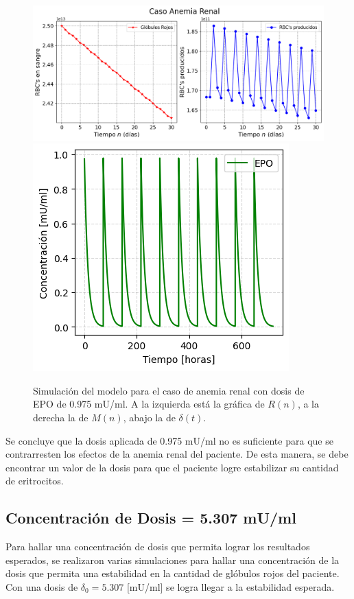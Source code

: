 \begin{figure}[H]
    \centering
    \captionsetup{justification=centering}
    \includegraphics[scale=0.534]{figures/AR11.png}
    \includegraphics[scale=0.8]{figures/AR12.png}
    \caption{Simulación del modelo para el caso de anemia renal con dosis de EPO de 0.975 mU/ml. A la izquierda está la gráfica de $R(n)$, a la derecha la de $M(n)$, abajo la de $\delta(t)$.}
    \label{sec:variaciones:fig:Anemia1}
\end{figure}

Se concluye que la dosis aplicada de 0.975 mU/ml no es suficiente para que se contrarresten los efectos de la anemia renal del paciente. De esta manera, se debe encontrar un valor de la dosis para que el paciente logre estabilizar su cantidad de eritrocitos.

\subsection{Concentración de Dosis = 5.307 mU/ml}

Para hallar una concentración de dosis que permita lograr los resultados esperados, se realizaron varias simulaciones para hallar una concentración de la dosis que permita una estabilidad en la cantidad de glóbulos rojos del paciente. Con una dosis de $\delta_0 = 5.307$ [mU/ml] se logra llegar a la estabilidad esperada.


